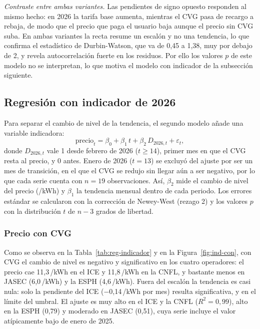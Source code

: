 \documentclass[conference]{IEEEtran}
\newcommand{\crc}{\textcolonmonetary} %
\begin{document}
\textit{Contraste entre ambas variantes.} Las pendientes de signo opuesto responden al mismo hecho: en 2026 la tarifa base aumenta, mientras el CVG pasa de recargo a rebaja, de modo que el precio que paga el usuario baja aunque el precio sin CVG suba. En ambas variantes la recta resume un escal\'on y no una tendencia, lo que confirma el estad\'istico de Durbin-Watson, que va de 0,45 a 1,38, muy por debajo de 2, y revela autocorrelaci\'on fuerte en los residuos. Por ello los valores $p$ de este modelo no se interpretan, lo que motiva el modelo con indicador de la subsecci\'on siguiente.















\subsection{Regresi\'on con indicador de 2026}

Para separar el cambio de nivel de la tendencia, el segundo modelo a\~nade una variable indicadora:
\begin{equation}
\text{precio}_t = \beta_0 + \beta_1\, t + \beta_2\, D_{2026,t} + \varepsilon_t,
\label{eq:reg_indicador}
\end{equation}
donde $D_{2026,t}$ vale 1 desde febrero de 2026 ($t \geq 14$), primer mes en que el CVG resta al precio, y 0 antes. Enero de 2026 ($t = 13$) se excluy\'o del ajuste por ser un mes de transici\'on, en el que el CVG se redujo sin llegar a\'un a ser negativo, por lo que cada serie cuenta con $n = 19$ observaciones. As\'i, $\beta_2$ mide el cambio de nivel del precio (\crc/kWh) y $\beta_1$ la tendencia mensual dentro de cada periodo. Los errores est\'andar se calcularon con la correcci\'on de Newey-West (rezago 2) y los valores $p$ con la distribuci\'on $t$ de $n-3$ grados de libertad.

\subsubsection{Precio con CVG}

Como se observa en la Tabla~\ref{tab:reg-indicador} y en la Figura~\ref{fig:ind-con}, con CVG el cambio de nivel es negativo y significativo en los cuatro operadores: el precio cae 11,3\,\crc/kWh en el ICE y 11,8\,\crc/kWh en la CNFL, y bastante menos en JASEC (6,0\,\crc/kWh) y la ESPH (4,6\,\crc/kWh). Fuera del escal\'on la tendencia es casi nula: solo la pendiente del ICE ($-$0,14\,\crc/kWh por mes) resulta significativa, y en el l\'imite del umbral. El ajuste es muy alto en el ICE y la CNFL ($R^2 = 0{,}99$), alto en la ESPH (0,79) y moderado en JASEC (0,51), cuya serie incluye el valor at\'ipicamente bajo de enero de 2025.
\end{document}
